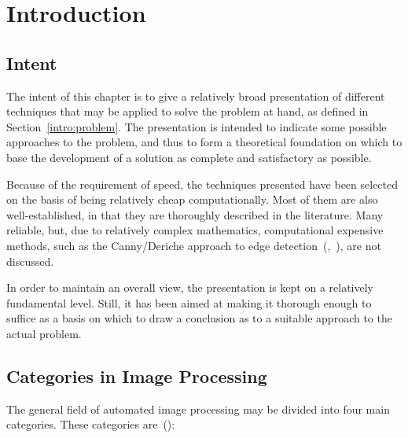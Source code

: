 
\section{Introduction}
\label{image:intro}

\subsection{Intent}
\label{image:intro:intent}

The intent of this chapter is to give a relatively broad presentation
of different techniques that may be applied to solve the problem at
hand, as defined in Section~\ref{intro:problem}.  The presentation is
intended to indicate some possible approaches to the problem, and thus
to form a theoretical foundation on which to base the development of a
solution as complete and satisfactory as possible.

Because of the requirement of speed, the techniques presented have
been selected on the basis of being relatively cheap computationally.
Most of them are also well-established, in that they are thoroughly
described in the literature.  Many reliable, but, due to relatively
complex mathematics, computational expensive methods, such as the
Canny/Deriche approach to edge
detection~(\cite{canny},~\cite{deriche}), are not discussed.

In order to maintain an overall view, the presentation is kept on a
relatively fundamental level.  Still, it has been aimed at making it
thorough enough to suffice as a basis on which to draw a conclusion
as to a suitable approach to the actual problem.

\subsection{Categories in Image Processing}
\label{image:intro:categories}

The general field of automated image processing may be divided into
four main categories.  These categories are~(\cite{digim}):

